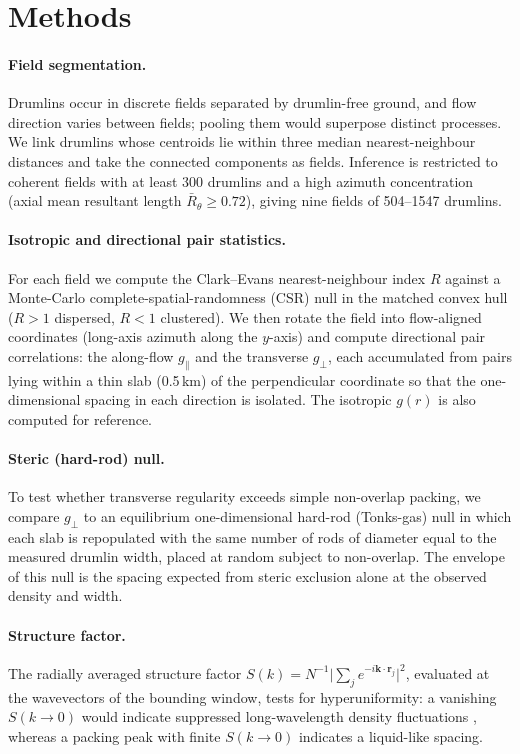 \documentclass[11pt]{article}
\begin{document}
\section{Methods}
\paragraph{Field segmentation.}
Drumlins occur in discrete fields separated by drumlin-free ground, and flow direction varies between
fields; pooling them would superpose distinct processes. We link drumlins whose centroids lie within
three median nearest-neighbour distances and take the connected components as fields. Inference is
restricted to coherent fields with at least 300 drumlins and a high azimuth concentration (axial mean
resultant length $\bar R_\theta\ge0.72$), giving nine fields of 504--1547 drumlins.

\paragraph{Isotropic and directional pair statistics.}
For each field we compute the Clark--Evans nearest-neighbour index $R$ \citep{clark1954} against a
Monte-Carlo complete-spatial-randomness (CSR) null in the matched convex hull ($R>1$ dispersed, $R<1$
clustered). We then rotate the field into flow-aligned coordinates (long-axis azimuth along the
$y$-axis) and compute directional pair correlations: the along-flow $g_\parallel$ and the transverse
$g_\perp$, each accumulated from pairs lying within a thin slab (0.5\,km) of the perpendicular
coordinate so that the one-dimensional spacing in each direction is isolated. The isotropic $g(r)$ is
also computed for reference.

\paragraph{Steric (hard-rod) null.}
To test whether transverse regularity exceeds simple non-overlap packing, we compare $g_\perp$ to an
equilibrium one-dimensional hard-rod (Tonks-gas) null in which each slab is repopulated with the same
number of rods of diameter equal to the measured drumlin width, placed at random subject to
non-overlap. The envelope of this null is the spacing expected from steric exclusion alone at the
observed density and width.

\paragraph{Structure factor.}
The radially averaged structure factor $S(k)=N^{-1}\big|\sum_j e^{-i\mathbf k\cdot\mathbf r_j}\big|^2$,
evaluated at the wavevectors of the bounding window, tests for hyperuniformity: a vanishing
$S(k\!\to\!0)$ would indicate suppressed long-wavelength density fluctuations \citep{torquato2018},
whereas a packing peak with finite $S(k\!\to\!0)$ indicates a liquid-like spacing.
\end{document}
